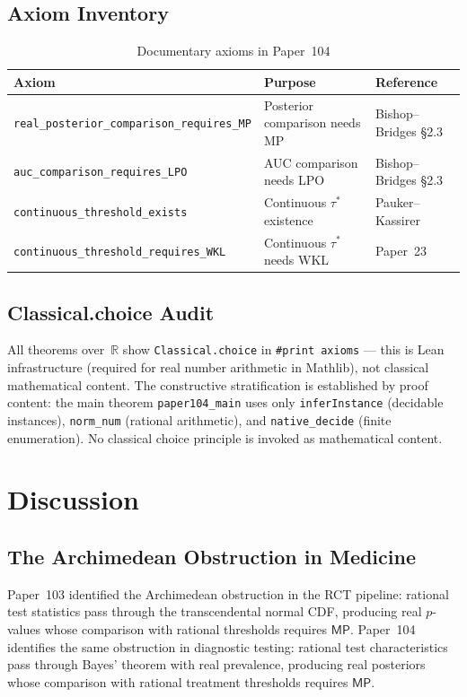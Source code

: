 \documentclass[11pt,a4paper]{article}
\theoremstyle{plain}
\theoremstyle{definition}
\newcommand{\MP}{\textsf{MP}}
\newcommand{\R}{\mathbb{R}}
\begin{document}
\subsection{Axiom Inventory}

\begin{table}[ht]
\centering
\caption{Documentary axioms in Paper~104}
\label{tab:axioms}
\begin{tabular}{lll}
\toprule
Axiom & Purpose & Reference \\
\midrule
\texttt{real\_posterior\_comparison\_requires\_MP} & Posterior comparison needs MP & Bishop--Bridges \S2.3 \\
\texttt{auc\_comparison\_requires\_LPO} & AUC comparison needs LPO & Bishop--Bridges \S2.3 \\
\texttt{continuous\_threshold\_exists} & Continuous $\tau^*$ existence & Pauker--Kassirer \\
\texttt{continuous\_threshold\_requires\_WKL} & Continuous $\tau^*$ needs WKL & Paper~23 \\
\bottomrule
\end{tabular}
\end{table}

\subsection{Classical.choice Audit}

All theorems over~$\R$ show \texttt{Classical.choice} in \texttt{\#print axioms} --- this is Lean infrastructure (required for real number arithmetic in Mathlib), not classical mathematical content.  The constructive stratification is established by proof content: the main theorem \texttt{paper104\_main} uses only \texttt{inferInstance} (decidable instances), \texttt{norm\_num} (rational arithmetic), and \texttt{native\_decide} (finite enumeration).  No classical choice principle is invoked as mathematical content.

\section{Discussion}\label{sec:discussion}

\subsection{The Archimedean Obstruction in Medicine}

Paper~103 identified the Archimedean obstruction in the RCT pipeline: rational test statistics pass through the transcendental normal CDF, producing real $p$-values whose comparison with rational thresholds requires $\MP$.  Paper~104 identifies the same obstruction in diagnostic testing: rational test characteristics pass through Bayes' theorem with real prevalence, producing real posteriors whose comparison with rational treatment thresholds requires $\MP$.
\end{document}
